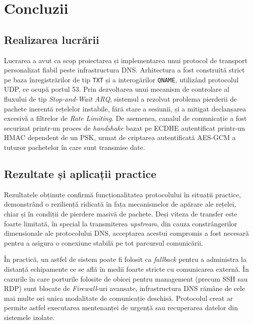 \section{Concluzii}

\subsection{Realizarea lucrării}
Lucrarea a avut ca scop proiectarea și implementarea unui protocol de transport personalizat fiabil peste infrastructura DNS. Arhitectura a fost construită strict pe baza înregistrărilor de tip \texttt{TXT} și a interogărilor \texttt{QNAME}, utilizând protocolul UDP, ce ocupă portul 53. Prin dezvoltarea unui mecanism de controlare al fluxului de tip \textit{Stop-and-Wait ARQ}, sistemul a rezolvat problema pierderii de pachete inerentă rețelelor instabile, fără stare a sesiunii, și a mitigat declanșarea excesivă a filtrelor de \textit{Rate Limiting}. De asemenea, canalul de comunicație a fost securizat printr-un proces de \textit{handshake} bazat pe ECDHE autentificat printr-un HMAC dependent de un PSK, urmat de criptarea autentificată AES-GCM a tuturor pachetelor în care sunt transmise date.

\subsection{Rezultate și aplicații practice}
Rezultatele obținute confirmă funcționalitatea protocolului în situații practice, demonstrând o reziliență ridicată în fața mecanismelor de apărare ale rețelei, chiar și în condiții de pierdere masivă de pachete. Deși viteza de transfer este foarte limitată, în special la transmiterea \textit{upstream}, din cauza constrângerilor dimensionale ale protocolului DNS, acceptarea acestui compromis a fost necesară pentru a asigura o conexiune stabilă pe tot parcursul comunicării.

În practică, un astfel de sistem poate fi folosit ca \textit{fallback} pentru a administra la distanță echipamente ce se află în medii foarte stricte cu comunicarea externă. În cazurile în care porturile folosite de obicei pentru management (precum SSH sau RDP) sunt blocate de \textit{Firewall}-uri avansate, infrastructura DNS rămâne de cele mai multe ori unica modalitate de comunicație deschisă. Protocolul creat ar permite astfel executarea mentenanței de urgență sau recuperarea datelor din sistemele izolate. 

